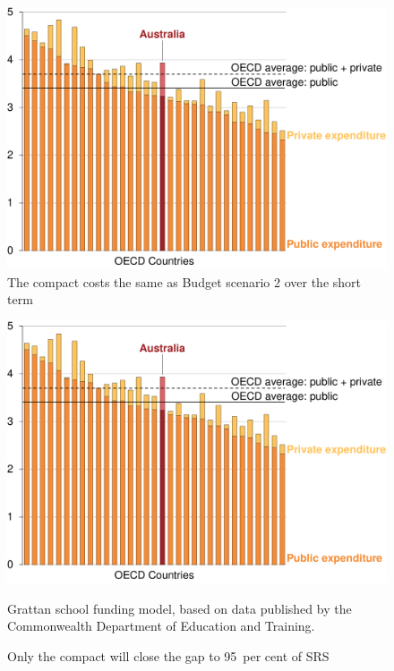 \documentclass{grattan}
\begin{document}
\begin{figure}
\caption{The compact costs the same as Budget scenario 2 over the short term}\label{fig:compact-costs-about-same-as-scenario-2}


\includegraphics[page=19]{atlas/Charts.pdf}

\end{figure}

\begin{figure}
\caption{Only the compact will close the gap to 95~per cent of SRS}\label{fig:compact-closes-the-gap-unlike-other-scenarios}

\includegraphics[page=20]{atlas/Charts.pdf}

{Grattan school funding model, based on data published by the Commonwealth Department of Education and Training.}
\end{figure}
\end{document}
